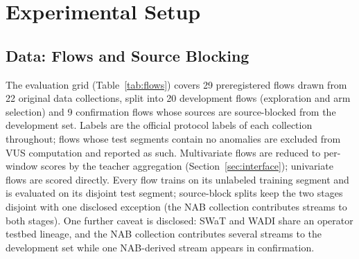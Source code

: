 \section{Experimental Setup}\label{sec:setup}

\subsection{Data: Flows and Source Blocking}\label{sec:setup-data}
The evaluation grid (Table~\ref{tab:flows}) covers 29 preregistered flows drawn from 22 original
data collections, split into 20 development flows (exploration and arm
selection) and 9 confirmation flows whose sources are source-blocked from the
development set. Labels are the official protocol labels of each
collection throughout; flows whose test segments contain no anomalies are
excluded from VUS computation and reported as such. Multivariate flows
are reduced to per-window scores by the teacher aggregation
(Section~\ref{sec:interface}); univariate flows are scored directly.
Every flow trains on its unlabeled training segment and is evaluated on
its disjoint test segment; source-block splits keep the two stages
disjoint with one disclosed exception (the NAB collection contributes
streams to both stages). One further caveat is disclosed: SWaT and WADI
share an operator testbed lineage, and the NAB
collection contributes several streams to the development set while one
NAB-derived stream appears in confirmation.

